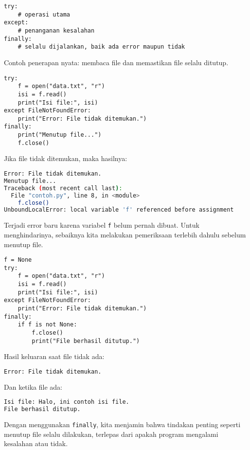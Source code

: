\begin{lstlisting}[style=PythonStyle, caption={Struktur penggunaan blok finally}]
try:
    # operasi utama
except:
    # penanganan kesalahan
finally:
    # selalu dijalankan, baik ada error maupun tidak
\end{lstlisting}

Contoh penerapan nyata: membaca file dan memastikan file selalu ditutup.

\begin{lstlisting}[style=PythonStyle, caption={Contoh penggunaan finally untuk pembersihan}]
try:
    f = open("data.txt", "r")
    isi = f.read()
    print("Isi file:", isi)
except FileNotFoundError:
    print("Error: File tidak ditemukan.")
finally:
    print("Menutup file...")
    f.close()
\end{lstlisting}

Jika file tidak ditemukan, maka hasilnya:

\begin{lstlisting}[language=bash]
Error: File tidak ditemukan.
Menutup file...
Traceback (most recent call last):
  File "contoh.py", line 8, in <module>
    f.close()
UnboundLocalError: local variable 'f' referenced before assignment
\end{lstlisting}

Terjadi error baru karena variabel \texttt{f} belum pernah dibuat. Untuk menghindarinya, sebaiknya kita melakukan pemeriksaan terlebih dahulu sebelum menutup file.

\begin{lstlisting}[style=PythonStyle, caption={Menangani variabel dengan aman di finally}]
f = None
try:
    f = open("data.txt", "r")
    isi = f.read()
    print("Isi file:", isi)
except FileNotFoundError:
    print("Error: File tidak ditemukan.")
finally:
    if f is not None:
        f.close()
        print("File berhasil ditutup.")
\end{lstlisting}

Hasil keluaran saat file tidak ada:

\begin{lstlisting}[language=bash]
Error: File tidak ditemukan.
\end{lstlisting}

Dan ketika file ada:

\begin{lstlisting}[language=bash]
Isi file: Halo, ini contoh isi file.
File berhasil ditutup.
\end{lstlisting}

Dengan menggunakan \texttt{finally}, kita menjamin bahwa tindakan penting seperti menutup file selalu dilakukan, terlepas dari apakah program mengalami kesalahan atau tidak.


